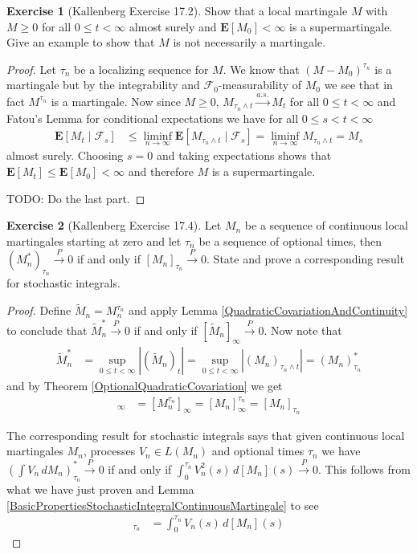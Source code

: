 \documentclass{amsbook}
\theoremstyle{definition}
\newtheorem{xca}{Exercise}
\theoremstyle{remark}
\newcommand{\expectation}[1]{\textbf{E}\left[#1\right]}
\newcommand{\cexpectationlong}[2]{\textbf{E}\left[ #2 \mid #1 \right]}
\newcommand{\abs}[1]{\left \vert #1 \right \vert}
\newcommand{\toprob}{\overset{P}\to}
\newcommand{\toas}{\overset{a.s.}\to}
\begin{document}
\begin{xca}[Kallenberg Exercise 17.2]Show that a
  local martingale $M$ with $M \geq 0$ for all $0 \leq t < \infty$
  almost surely and $\expectation{M_0} < \infty$ is a
  supermartingale.  Give an example to show that $M$ is not necessarily a martingale.
\end{xca}
\begin{proof}
Let $\tau_n$ be a localizing sequence for $M$.  We know that $(M -
M_0)^{\tau_n}$ is a martingale but by the integrability and 
$\mathcal{F}_0$-measurability of $M_0$ we
see that in fact $M^{\tau_n}$ is a martingale.  Now 
since $M \geq 0$, $M_{\tau_n \wedge t} \toas M_t$ for all $0 \leq t < \infty$ and 
Fatou's Lemma for conditional expectations we have for all $0 \leq s < t < \infty$
\begin{align*}
\cexpectationlong{\mathcal{F}_s}{M_t} &\leq 
\liminf_{n \to \infty}\cexpectationlong{\mathcal{F}_s}{M_{\tau_n \wedge t}}
= \liminf_{n \to \infty} M_{\tau_n \wedge t} = M_{s}
\end{align*}
almost surely.  Choosing $s=0$ and taking expectations shows that $\expectation{M_t} \leq \expectation{M_0} < \infty$ 
and therefore $M$ is a supermartingale.

TODO: Do the last part.
\end{proof}
\begin{xca}[Kallenberg Exercise 17.4]Let $M_n$ be a sequence of continuous local
  martingales starting at zero and let $\tau_n$ be a sequence of
  optional times, then $(M^*_n)_{\tau_n} \toprob 0$ if and only if
  $[M_n]_{\tau_n} \toprob 0$.  State and prove a corresponding result
  for stochastic integrals.
\end{xca}
\begin{proof}
Define $\tilde{M}_n = M_n^{\tau_n}$ and apply Lemma
\ref{QuadraticCovariationAndContinuity} to conclude that
$\tilde{M}_n^* \toprob 0$ if and only if $[\tilde{M}_n]_\infty \toprob
0$.  Now note that 
\begin{align*}
\tilde{M}^*_n 
&= \sup_{0 \leq t < \infty} \abs{(\tilde{M}_n)_t} 
= \sup_{0 \leq t < \infty} \abs{(M_n)_{\tau_n \wedge t}} 
= (M_n)^*_{\tau_n}
\end{align*}
and by Theorem \ref{OptionalQuadraticCovariation} we get
\begin{align*}
[\tilde{M}_n]_\infty
&= [M^{\tau_n}_n]_\infty
=[M_n]^{\tau_n}_\infty
=[M_n]_{\tau_n}
\end{align*}

The corresponding result for stochastic integrals says that
given continuous local martingales $M_n$, processes $V_n \in
L(M_n)$ and optional times $\tau_n$ we have $\left(\int V_n \,
dM_n\right)^*_{\tau_n} \toprob 0$ if and only if $\int_0^{\tau_n} V_n^2(s) \, d[M_n](s)
\toprob 0$.  This follows from what we have just proven and 
Lemma \ref{BasicPropertiesStochasticIntegralContinuousMartingale} to see
\begin{align*}
[\int V_n \, dM_n]_{\tau_n} &= \int_0^{\tau_n} V_n(s) \, d[M_n](s)
\end{align*}
\end{proof}
\end{document}
